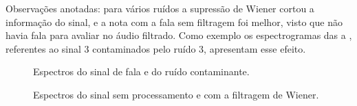 Observações anotadas: para vários ruídos a supressão de Wiener cortou a informação do sinal, e a nota com a fala sem filtragem foi melhor, visto que não havia fala para avaliar no áudio filtrado. Como exemplo os espectrogramas das  a , referentes ao sinal 3 contaminados pelo ruído 3, apresentam esse efeito.

\begin{figure}[H]
\quad
{}
\caption{Espectros do sinal de fala e do ruído contaminante.}
\label{aff3}
\end{figure}

\begin{figure}[H]
\quad
{}
\caption{Espectros do sinal sem processamento e com a filtragem de Wiener.}
\label{aff4}
\end{figure}

